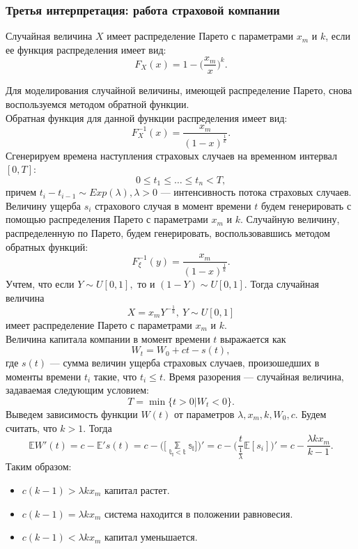\documentclass[11pt]{article}
\begin{document}
\subsubsection{Третья интерпретация: работа страховой компании}
\begin{opr}
	Случайная величина $X$ имеет распределение Парето с параметрами $x_m$ и $k$, если ее функция распределения имеет вид:
	\[ F_X(x) = 1 - \bigg(\frac{x_m}{x}\bigg)^k. \]
\end{opr}
Для моделирования случайной величины, имеющей распределение Парето, снова воспользуемся методом обратной функции.\\
Обратная функция для данной функции распределения имеет вид:
\[ F^{-1}_X(x) = \frac{x_m}{(1 - x)^\frac{1}{k}}. \]
Сгенерируем времена наступления страховых случаев на временном интервал $[0,T]$:
\[ 0 \leq t_1 \leq \dots \leq t_n < T, \]
причем $t_i - t_{i-1} \sim Exp(\lambda), \lambda > 0$ --- интенсивность потока страховых случаев.\\
Величину ущерба $s_i$ страхового случая в момент времени $t$ будем генерировать с помощью распределения Парето с параметрами $x_m$ и $k$. Случайную величину, распределенную по Парето, будем генерировать, воспользовавшись методом обратных функций:
\[ F^{-1}_\xi (y) = \frac{x_m}{(1-x)^\frac{1}{k}}. \]
Учтем, что если $Y \sim U[0,1],$ то и $(1 - Y) \sim U[0,1]$. Тогда случайная величина
\[ X = x_m Y^{-\frac{1}{k}}, \ Y \sim U[0,1] \]
имеет распределение Парето с параметрами $x_m$ и  $k$.\\
Величина капитала компании в момент времени $t$ выражается как
\[ W_t = W_0 + ct - s(t), \]
где $s(t)$ --- сумма величин ущерба страховых случаев, произошедших в моменты времени $t_i$ такие, что $t_i \leq t$. Время разорения --- случайная величина, задаваемая следующим условием:
\[ T = \min \{t > 0| W_t < 0 \}.\]
Выведем зависимость функции $W(t)$ от параметров $\lambda, x_m, k,W_0,c.$ Будем считать, что $k > 1$. Тогда 
\[\mathbb{E}W'(t) = c - \mathbb{E}'s(t) = c - \bigg( \mathbb{\bigg[\sum_{t_i < t}^{}s_i\bigg]} \bigg)' = c - \bigg(\frac{t}{\frac{1}{\lambda}}\mathbb{E}[s_i]\bigg)'=c - \frac{\lambda k x_m}{k -1}.\]
Таким образом:
\begin{itemize}
	\item $c(k-1) > \lambda kx_m$ капитал растет.
	\item $c(k-1) = \lambda kx_m$ система находится в положении равновесия.
	\item $c(k-1) < \lambda kx_m$ капитал уменьшается.
\end{itemize}
\end{document}
